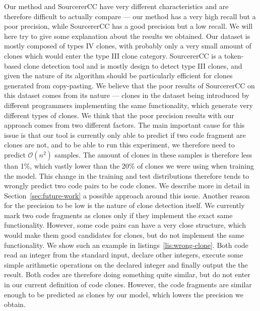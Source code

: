 Our method and SourcererCC have very different characteristics and are therefore
difficult to actually compare --- our method has a very high recall but a poor
precision, while SourcererCC has a good precision but a low recall. We will
here try to give some explanation about the results we obtained. Our dataset is
mostly composed of types IV clones, with probably only a very small amount of
clones which would enter the type III clone category. SourcererCC is a
token-based clone detection tool and is mostly design to detect type III clones,
and given the nature of its algorithm should be particularly efficient for
clones generated from copy-pasting. We believe that the poor results of
SourcererCC on this dataset comes from its nature --- clones in the dataset
being introduced by different programmers implementing the same functionality,
which generate very different types of clones. We think that the poor precision
results with our approach comes from two different factors. The main important
cause for this issue is that our tool is currently only able to predict if two
code fragment are clones are not, and to be able to run this experiment, we
therefore need to predict $\mathcal{O}\left( n^2 \right)$ samples. The amount of
clones in these samples is therefore less than 1\%, which vastly lower than the
20\% of clones we were using when training the model. This change in the
training and test distributions therefore tends to wrongly predict two code
pairs to be code clones. We describe more in detail in
Section~\ref{sec:future-work} a possible approach around this issue. Another
reason for the precision to be low is the nature of clone detection itself. We
currently mark two code fragments as clones only if they implement the exact
same functionality. However, some code pairs can have a very close structure,
which would make them good candidates for clones, but do not implement the same
functionality. We show such an example in listings~\ref{lis:wrong-clone}. Both
code read an integer from the standard input, declare other integers, execute
some simple arithmetic operations on the declared integer and finally output the
the result. Both codes are therefore doing something quite similar, but do not
enter in our current definition of code clones. However, the code fragments are
similar enough to be predicted as clones by our model, which lowers the
precision we obtain.
\begin{figure}
  
  
\end{figure}
